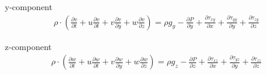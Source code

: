 \documentclass[11pt]{report}
\newcommand{\NI}{\noindent}
\begin{document}
	\NI y-component
	\begin{eqnarray*}
		\rho \cdot \left(\frac{\partial v}{\partial t} + u\frac{\partial v}{\partial t} + v\frac{\partial v}{\partial y}+ w \frac{\partial v}{\partial z}\right) = \rho g_y - \frac{\partial P}{\partial y} + \frac{\partial \tau_{xy}}{\partial x} + \frac{\partial \tau_{yy}}{\partial y} + \frac{\partial \tau_{zy}}{\partial z}
	\end{eqnarray*}
	
	\NI z-component
	\begin{eqnarray*}
		\rho \cdot \left(\frac{\partial w}{\partial t} + u\frac{\partial w}{\partial t} + v\frac{\partial w}{\partial y}+ w \frac{\partial w}{\partial z}\right) = \rho g_z - \frac{\partial P}{\partial z} + \frac{\partial \tau_{xz}}{\partial x} + \frac{\partial \tau_{yz}}{\partial y} + \frac{\partial \tau_{zz}}{\partial z}
	\end{eqnarray*}
	
\end{document}
